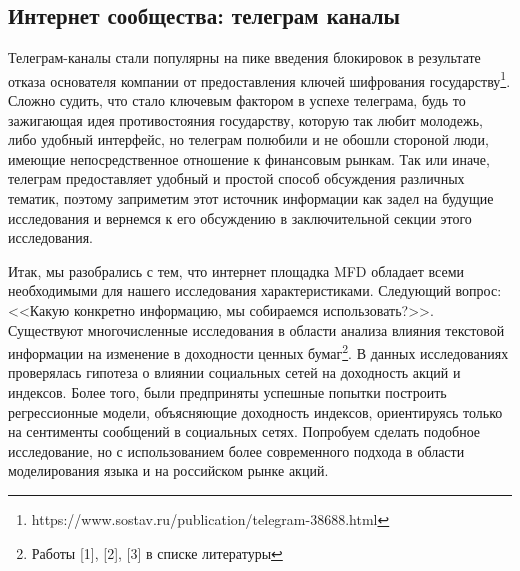 \documentclass{article}
\begin{document}
\subsection{Интернет сообщества: телеграм каналы}
Телеграм-каналы стали популярны на пике введения блокировок в результате отказа основателя компании от предоставления ключей шифрования государству\footnote{https://www.sostav.ru/publication/telegram-38688.html}. Сложно судить, что стало ключевым фактором в успехе телеграма, будь то зажигающая идея противостояния государству, которую так любит молодежь, либо удобный интерфейс, но телеграм полюбили и не обошли стороной люди, имеющие непосредственное отношение к финансовым рынкам. Так или иначе, телеграм предоставляет удобный и простой способ обсуждения различных тематик, поэтому заприметим этот источник информации как задел на будущие исследования и вернемся к его обсуждению в заключительной секции этого исследования. 
\par Итак, мы разобрались с тем, что интернет площадка MFD обладает всеми необходимыми для нашего исследования характеристиками. Следующий вопрос: <<Какую конкретно информацию, мы собираемся использовать?>>. Существуют многочисленные исследования в области анализа влияния текстовой информации на изменение в доходности ценных бумаг\footnote{Работы [1], [2], [3] в списке литературы}. В данных исследованиях проверялась гипотеза о влиянии социальных сетей на доходность акций и индексов. Более того, были предприняты успешные попытки построить регрессионные модели, объясняющие доходность индексов, ориентируясь только на сентименты сообщений в социальных сетях. Попробуем сделать подобное исследование, но с использованием более современного подхода в области моделирования языка и на российском рынке акций.
\end{document}
